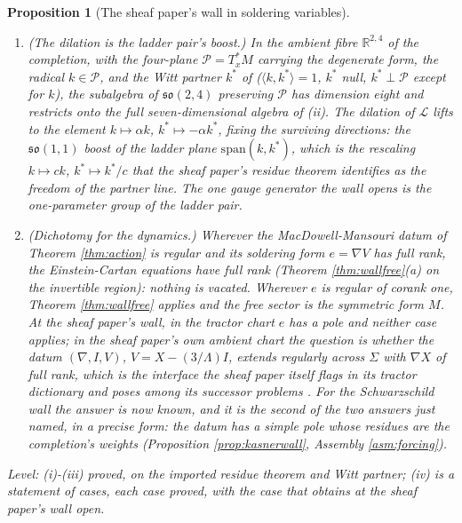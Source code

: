 \documentclass[11pt]{article}
\newtheorem{proposition}[theorem]{Proposition}
\theoremstyle{definition}
\newcommand{\ip}[2]{\langle #1, #2\rangle}
\begin{document}
\begin{proposition}[The sheaf paper's wall in soldering variables]
\begin{enumerate}
\item[(iii)] \emph{(The dilation is the ladder pair's boost.)} In the ambient fibre $\mathbb{R}^{2,4}$ of the completion, with the four-plane $\mathcal{P} = T^*_x M$ carrying the degenerate form, the radical $k \in \mathcal{P}$, and the Witt partner $k^*$ of \cite[Cor.~4.5]{ButlerT4} ($\ip{k}{k^*} = 1$, $k^*$ null, $k^* \perp \mathcal{P}$ except for $k$), the subalgebra of $\mathfrak{so}(2,4)$ preserving $\mathcal{P}$ has dimension eight and restricts onto the full seven-dimensional algebra of (ii). The dilation of $\mathcal{L}$ lifts to the element $k \mapsto \alpha k$, $k^* \mapsto -\alpha k^*$, fixing the surviving directions: the $\mathfrak{so}(1,1)$ boost of the ladder plane $\mathrm{span}(k, k^*)$, which is the rescaling $k \mapsto ck$, $k^* \mapsto k^*/c$ that the sheaf paper's residue theorem identifies as the freedom of the partner line. The one gauge generator the wall opens is the one-parameter group of the ladder pair.
\item[(iv)] \emph{(Dichotomy for the dynamics.)} Wherever the MacDowell-Mansouri datum of Theorem \ref{thm:action} is regular and its soldering form $e = \nabla V$ has full rank, the Einstein-Cartan equations have full rank (Theorem \ref{thm:wallfree}(a) on the invertible region): nothing is vacated. Wherever $e$ is regular of corank one, Theorem \ref{thm:wallfree} applies and the free sector is the symmetric form $M$. At the sheaf paper's wall, in the tractor chart $e$ has a pole and neither case applies; in the sheaf paper's own ambient chart the question is whether the datum $(\nabla, I, V)$, $V = X - (3/\Lambda)I$, extends regularly across $\Sigma$ with $\nabla X$ of full rank, which is the interface the sheaf paper itself flags in its tractor dictionary and poses among its successor problems \cite[\S 7.3-7.4]{ButlerT4}. For the Schwarzschild wall the answer is now known, and it is the second of the two answers just named, in a precise form: the datum has a simple pole whose residues are the completion's weights (Proposition \ref{prop:kasnerwall}, Assembly \ref{asm:forcing}).
\end{enumerate}
\emph{Level:} (i)-(iii) proved, on the imported residue theorem and Witt partner; (iv) is a statement of cases, each case proved, with the case that obtains at the sheaf paper's wall open.
\end{proposition}
\end{document}
